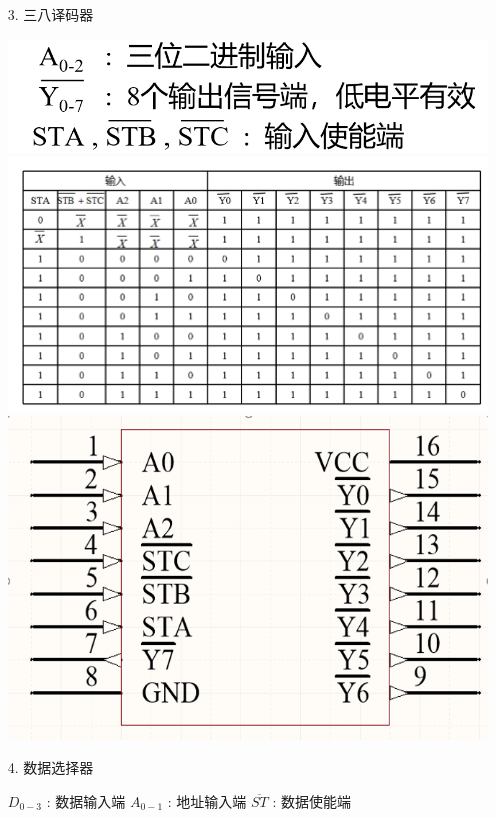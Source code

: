 \documentclass[UTF8]{ctexart}
\begin{document}
\begin{enumerate}
\begin{itemize}
\begin{itemize}
                        \item [3.] 三八译码器 
                        \begin{center}
                            \includegraphics[scale = 0.4]{2.png}
                            \includegraphics[scale = 0.4]{3.png}
                            \includegraphics[scale = 0.4]{4.png}
                        \end{center}
                        \item [4.] 数据选择器
                        \begin{center}
                            $D_{0-3}$  :  数据输入端
                            $A_{0-1}$  :  地址输入端
                            $\overline{ST}$  :  数据使能端

\end{center}
\end{itemize}
\end{itemize}
\end{enumerate}
\end{document}
